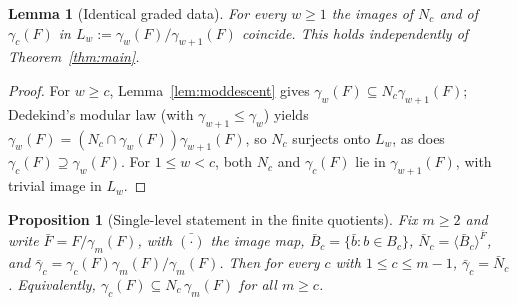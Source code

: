 \documentclass{amsart}
\newtheorem{lemma}{Lemma}
\newtheorem{proposition}{Proposition}
\theoremstyle{definition}
\theoremstyle{remark}
\begin{document}
\begin{lemma}[Identical graded data]\label{lem:gradedNc}
For every $w\ge1$ the images of $N_c$ and of $\gamma_c(F)$ in
$L_w:=\gamma_w(F)/\gamma_{w+1}(F)$ coincide. This holds independently of
Theorem~\ref{thm:main}.
\end{lemma}
\begin{proof}
For $w\ge c$, Lemma~\ref{lem:moddescent} gives $\gamma_w(F)\subseteq
N_c\gamma_{w+1}(F)$; Dedekind's modular law (with $\gamma_{w+1}\le\gamma_w$) yields
$\gamma_w(F)=(N_c\cap\gamma_w(F))\gamma_{w+1}(F)$, so $N_c$ surjects onto $L_w$, as
does $\gamma_c(F)\supseteq\gamma_w(F)$. For $1\le w<c$, both $N_c$ and $\gamma_c(F)$
lie in $\gamma_{w+1}(F)$, with trivial image in $L_w$.
\end{proof}

\begin{proposition}[Single-level statement in the finite quotients]\label{prop:finiteS}
Fix $m\ge 2$ and write $\bar F=F/\gamma_m(F)$, with $\bar{(\cdot)}$ the image map,
$\bar B_c=\{\bar b:b\in B_c\}$, $\bar N_c=\langle\bar B_c\rangle^{\bar F}$, and
$\bar\gamma_c=\gamma_c(F)\gamma_m(F)/\gamma_m(F)$.
Then for every $c$ with $1\le c\le m-1$, $\bar\gamma_c=\bar N_c$.
Equivalently, $\gamma_c(F)\subseteq N_c\,\gamma_m(F)$ for all $m\ge c$.
\end{proposition}
\end{document}
